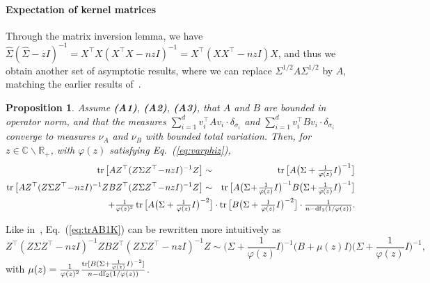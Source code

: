 \documentclass[11pt]{article}
\newcommand{\BEA}{\begin{eqnarray}}
\newcommand{\EEA}{\end{eqnarray}}
\newcommand{\tr}{\mathop{ \rm tr}}
\newcommand{\idm}{I}
\newcommand{\rb}{\mathbb{R}}
\newtheorem{proposition}{Proposition}
\newcommand{\eq}[1]{Eq.~(\ref{eq:#1})}
\def \hS{ \widehat{ \Sigma} }
\def \S{  { \Sigma} }
\begin{document}
\paragraph{Expectation of kernel matrices}
Through the matrix inversion lemma, we have
$\hS  ( \hS - z \idm)^{-1} = X^\top X ( X^\top X - nz \idm)^{-1} = X^\top ( XX^\top - nz \idm) X$, and thus we obtain another set of asymptotic results, where we can replace $\Sigma^{1/2} A \Sigma^{1/2}$ by $A$, matching the earlier results of~\cite[Theorem 4.6]{lejeune2022asymptotics}.

\begin{proposition}
\label{prop:spectralK}
Assume \textbf{(A1)}, \textbf{(A2)},  \textbf{(A3)}, that $A$ and $B$ are bounded in operator norm, and that
the measures $   \sum_{i=1}^d   v_i ^\top A v_i  \cdot\delta_{\sigma_i}$
and $   \sum_{i=1}^d   v_i ^\top B v_i  \cdot\delta_{\sigma_i}$ converge to measures $\nu_A$ and $\nu_B$ with bounded total variation. Then, for $z \in \mathbb{C} \backslash \rb_+$, with $\varphi(z)$ satisfying \eq{varphiz},
\BEA
\label{eq:trA1K}
\tr \big[ A Z^\top   ( Z \Sigma Z^\top \!-\! nz \idm)^{-1}  Z \big] 
& \sim &  \textstyle \tr \big[  A   \big( \S + \frac{1}{\varphi(z)} \idm \big)^{-1} \big]
\\
\notag \tr \big[ A  Z^\top   ( Z \Sigma Z^\top\! -\! nz \idm)^{-1}  Z  B  Z^\top   ( Z \Sigma Z^\top\! - \! nz \idm)^{-1}  Z\big]  
& \sim & \textstyle  \tr \big[  A \big( \S \!+\!  \frac{1}{\varphi(z)} \idm \big)^{-1} B  \big( \S \!+\!  \frac{1}{\varphi(z)} \idm \big)^{-1} \big]  \\
\label{eq:trAB1K}
& & \textstyle \hspace*{-4.5cm}+ \frac{1}{ \varphi(z)^2}   \tr \big[
    A    \big( \S + \frac{1}{\varphi(z)} \idm \big)^{-2}    \big]
     \cdot 
     \tr \big[
    B    \big( \S + \frac{1}{\varphi(z)} \idm \big)^{-2}    \big]
    \cdot   \frac{1}{ n -  {\rm df}_2(1/\varphi(z))  }.
    \EEA
\end{proposition}
  Like in~\cite[Theorem 4.6]{lejeune2022asymptotics}, \eq{trAB1K} can be rewritten more intuitively as
  $$\textstyle 
  Z^\top   ( Z \Sigma Z^\top\! -\! nz \idm)^{-1}  Z  B  Z^\top   ( Z \Sigma Z^\top\! - \! nz \idm)^{-1}  Z \sim
  \big( \S +  \frac{1}{\varphi(z)} \idm \big)^{-1} \big( B + \mu(z)\idm \big)  \big( \S +  \frac{1}{\varphi(z)} \idm \big)^{-1},
  $$
  with $  \mu(z) =  \frac{1}{ \varphi(z)^2}  \frac{\tr  [
    B     ( \S + \frac{1}{\varphi(z)} \idm  )^{-2}     ]}{n -  {\rm df}_2(1/\varphi(z)) }$.
  
\end{document}

